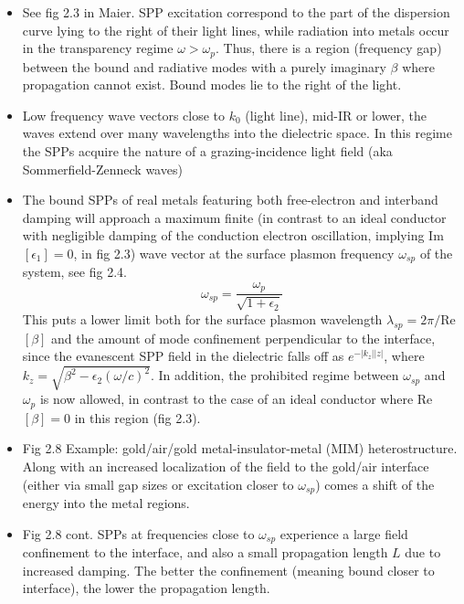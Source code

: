 \begin{itemize}
    \item See fig 2.3 in Maier. SPP excitation correspond to the part of the dispersion curve lying to the right of their light lines, while radiation into metals occur in the transparency regime $\omega > \omega_p$. Thus, there is a region (frequency gap) between the bound and radiative modes with a purely imaginary $\beta$ where propagation cannot exist. Bound modes lie to the right of the light. 
    
    \item Low frequency wave vectors close to $k_0$ (light line), mid-IR or lower, the waves extend over many wavelengths into the dielectric space. In this regime the SPPs acquire the nature of a grazing-incidence light field (aka Sommerfield-Zenneck waves)
    
    \item The bound SPPs of real metals featuring both free-electron and interband damping will approach a maximum finite (in contrast to an ideal conductor with negligible damping of the conduction electron oscillation, implying Im$[\epsilon_1] = 0$, in fig 2.3) wave vector at the surface plasmon frequency $\omega_{sp}$ of the system, see fig 2.4.
    \begin{equation}
        \omega_{sp} = \frac{\omega_p}{\sqrt{1+\epsilon_2}}
    \end{equation}
    This puts a lower limit both for the surface plasmon wavelength $\lambda_{sp} = 2\pi/$Re$[\beta]$ and the amount of mode confinement perpendicular to the interface, since the evanescent SPP field in the dielectric falls off as $e^{-|k_z| |z|}$, where $k_z = \sqrt{\beta^2 - \epsilon_2 (\omega/c)^2}$. In addition, the prohibited regime between $\omega_{sp}$ and $\omega_p$ is now allowed, in contrast to the case of an ideal conductor where Re$[\beta]=0$ in this region (fig 2.3).
    
    \item Fig 2.8 Example: gold/air/gold metal-insulator-metal (MIM) heterostructure. Along with an increased localization of the field to the gold/air interface (either via small gap sizes or excitation closer to $\omega_{sp}$) comes a shift of the energy into the metal regions.
    
    
    \item Fig 2.8 cont. SPPs at frequencies close to $\omega_{sp}$ experience a large field confinement to the interface, and also a small propagation length $L$ due to increased damping. The better the confinement (meaning bound closer to interface), the lower the propagation length.
    

\end{itemize}

